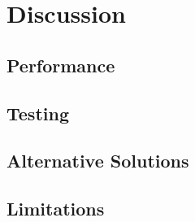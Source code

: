 

\chapter{Discussion}
\label{ch:discussion}

\section{Performance}
\label{sec:discussion:performance}

\kant[30-32]

\section{Testing}
\label{sec:discussion:testing}

\kant[33-35]

\section{Alternative Solutions}
\label{sec:discussion:alternative+solutions}

\kant[36-38]

\section{Limitations}
\label{sec:discussion:limitations}

\kant[39-41]

